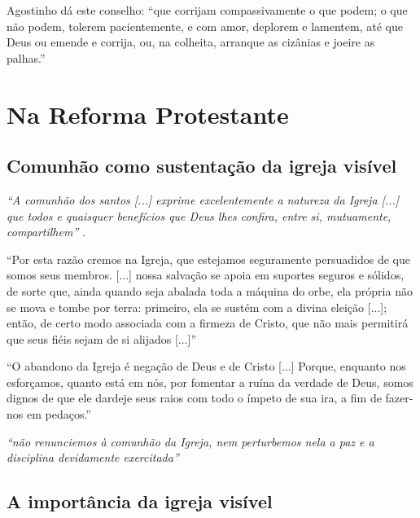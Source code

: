 \begin{citacao}
Agostinho dá este conselho: ``que corrijam compassivamente o que podem; o que não podem, tolerem pacientemente, e com amor, deplorem e lamentem, até que Deus ou emende e corrija, ou, na colheita, arranque as cizânias e joeire as palhas.'' \cite[v. 4, p. 102]{calvino2022}
\end{citacao}

\section{Na Reforma Protestante}

\subsection{Comunhão como sustentação da igreja visível}
\textit{``A comunhão dos santos [...] exprime excelentemente a natureza da Igreja [...] que todos e quaisquer benefícios que Deus lhes confira, entre si, mutuamente, compartilhem''} \cite[v. 4, p. 75-76]{calvino2022}.

\begin{citacao}
``Por esta razão cremos na Igreja, que estejamos seguramente persuadidos de que somos seus membros. [...] nossa salvação se apoia em suportes seguros e sólidos, de sorte que, ainda quando seja abalada toda a máquina do orbe, ela própria não se mova e tombe por terra: primeiro, ela se sustém com a divina eleição [...]; então, de certo modo associada com a firmeza de Cristo, que não mais permitirá que seus fiéis sejam de si alijados [...]'' \cite[v. 4, p. 75-76]{calvino2022}
\end{citacao}

\begin{citacao}
``O abandono da Igreja é negação de Deus e de Cristo [...] Porque, enquanto nos esforçamos, quanto está em nós, por fomentar a ruína da verdade de Deus, somos dignos de que ele dardeje seus raios com todo o ímpeto de sua ira, a fim de fazer-nos em pedaços.'' \cite[v. 4, p. 92]{calvino2022}
\end{citacao}

\textit{``não renunciemos à comunhão da Igreja, nem perturbemos nela a paz e a disciplina devidamente exercitada''} \cite[v. 4, p. 95]{calvino2022}

\subsection{A importância da igreja visível}

